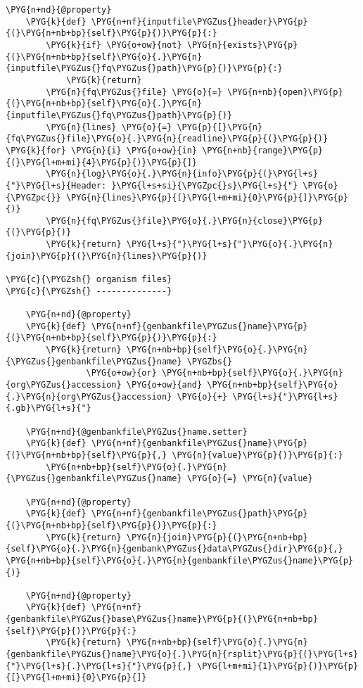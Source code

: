 \begin{Verbatim}[commandchars=\\\{\}]
    \PYG{n+nd}{@property}
    \PYG{k}{def} \PYG{n+nf}{inputfile\PYGZus{}header}\PYG{p}{(}\PYG{n+nb+bp}{self}\PYG{p}{)}\PYG{p}{:}
        \PYG{k}{if} \PYG{o+ow}{not} \PYG{n}{exists}\PYG{p}{(}\PYG{n+nb+bp}{self}\PYG{o}{.}\PYG{n}{inputfile\PYGZus{}fq\PYGZus{}path}\PYG{p}{)}\PYG{p}{:}
            \PYG{k}{return}
        \PYG{n}{fq\PYGZus{}file} \PYG{o}{=} \PYG{n+nb}{open}\PYG{p}{(}\PYG{n+nb+bp}{self}\PYG{o}{.}\PYG{n}{inputfile\PYGZus{}fq\PYGZus{}path}\PYG{p}{)}
        \PYG{n}{lines} \PYG{o}{=} \PYG{p}{[}\PYG{n}{fq\PYGZus{}file}\PYG{o}{.}\PYG{n}{readline}\PYG{p}{(}\PYG{p}{)} \PYG{k}{for} \PYG{n}{i} \PYG{o+ow}{in} \PYG{n+nb}{range}\PYG{p}{(}\PYG{l+m+mi}{4}\PYG{p}{)}\PYG{p}{]}
        \PYG{n}{log}\PYG{o}{.}\PYG{n}{info}\PYG{p}{(}\PYG{l+s}{"}\PYG{l+s}{Header: }\PYG{l+s+si}{\PYGZpc{}s}\PYG{l+s}{"} \PYG{o}{\PYGZpc{}} \PYG{n}{lines}\PYG{p}{[}\PYG{l+m+mi}{0}\PYG{p}{]}\PYG{p}{)}
        \PYG{n}{fq\PYGZus{}file}\PYG{o}{.}\PYG{n}{close}\PYG{p}{(}\PYG{p}{)}
        \PYG{k}{return} \PYG{l+s}{"}\PYG{l+s}{"}\PYG{o}{.}\PYG{n}{join}\PYG{p}{(}\PYG{n}{lines}\PYG{p}{)}

\PYG{c}{\PYGZsh{} organism files}
\PYG{c}{\PYGZsh{} --------------}

    \PYG{n+nd}{@property}
    \PYG{k}{def} \PYG{n+nf}{genbankfile\PYGZus{}name}\PYG{p}{(}\PYG{n+nb+bp}{self}\PYG{p}{)}\PYG{p}{:}
        \PYG{k}{return} \PYG{n+nb+bp}{self}\PYG{o}{.}\PYG{n}{\PYGZus{}genbankfile\PYGZus{}name} \PYGZbs{}
                \PYG{o+ow}{or} \PYG{n+nb+bp}{self}\PYG{o}{.}\PYG{n}{org\PYGZus{}accession} \PYG{o+ow}{and} \PYG{n+nb+bp}{self}\PYG{o}{.}\PYG{n}{org\PYGZus{}accession} \PYG{o}{+} \PYG{l+s}{"}\PYG{l+s}{.gb}\PYG{l+s}{"}

    \PYG{n+nd}{@genbankfile\PYGZus{}name.setter}
    \PYG{k}{def} \PYG{n+nf}{genbankfile\PYGZus{}name}\PYG{p}{(}\PYG{n+nb+bp}{self}\PYG{p}{,} \PYG{n}{value}\PYG{p}{)}\PYG{p}{:}
        \PYG{n+nb+bp}{self}\PYG{o}{.}\PYG{n}{\PYGZus{}genbankfile\PYGZus{}name} \PYG{o}{=} \PYG{n}{value}

    \PYG{n+nd}{@property}
    \PYG{k}{def} \PYG{n+nf}{genbankfile\PYGZus{}path}\PYG{p}{(}\PYG{n+nb+bp}{self}\PYG{p}{)}\PYG{p}{:}
        \PYG{k}{return} \PYG{n}{join}\PYG{p}{(}\PYG{n+nb+bp}{self}\PYG{o}{.}\PYG{n}{genbank\PYGZus{}data\PYGZus{}dir}\PYG{p}{,} \PYG{n+nb+bp}{self}\PYG{o}{.}\PYG{n}{genbankfile\PYGZus{}name}\PYG{p}{)}

    \PYG{n+nd}{@property}
    \PYG{k}{def} \PYG{n+nf}{genbankfile\PYGZus{}base\PYGZus{}name}\PYG{p}{(}\PYG{n+nb+bp}{self}\PYG{p}{)}\PYG{p}{:}
        \PYG{k}{return} \PYG{n+nb+bp}{self}\PYG{o}{.}\PYG{n}{genbankfile\PYGZus{}name}\PYG{o}{.}\PYG{n}{rsplit}\PYG{p}{(}\PYG{l+s}{"}\PYG{l+s}{.}\PYG{l+s}{"}\PYG{p}{,} \PYG{l+m+mi}{1}\PYG{p}{)}\PYG{p}{[}\PYG{l+m+mi}{0}\PYG{p}{]}


\end{Verbatim}
